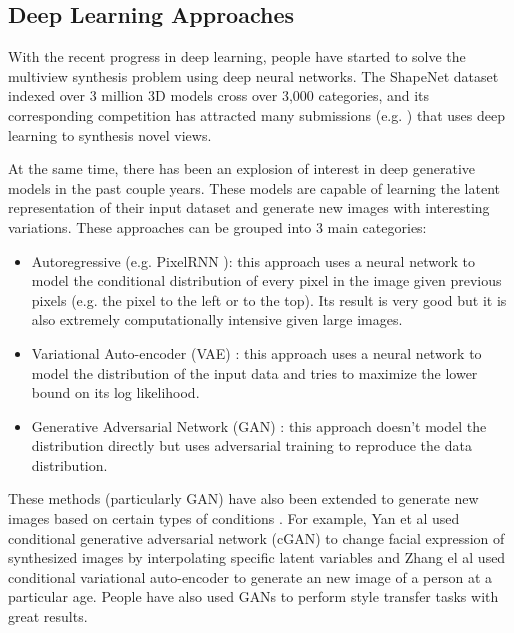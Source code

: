 \documentclass[10pt,conference]{IEEEtran}
\begin{document}
\subsection{Deep Learning Approaches}

With the recent progress in deep learning, people have started to solve the multiview synthesis problem using deep neural networks. The ShapeNet dataset \autocite{chang2015shapenet} indexed over 3 million 3D models cross over 3,000 categories, and its corresponding competition has attracted many submissions (e.g. \autocite{zhou2016view, tatarchenko2016multi, park2017transformation}) that uses deep learning to synthesis novel views.

At the same time, there has been an explosion of interest in deep generative models in the past couple years. These models are capable of learning the latent representation of their input dataset and generate new images with interesting variations. These approaches can be grouped into 3 main categories:

\begin{itemize}
\item Autoregressive (e.g. PixelRNN \autocite{oord2016pixel}): this approach uses a neural network to model the conditional distribution of every pixel in the image given previous pixels (e.g. the pixel to the left or to the top). Its result is very good but it is also extremely computationally intensive given large images.

\item Variational Auto-encoder (VAE) \autocite{kingma2013auto}: this approach uses a neural network to model the distribution of the input data and tries to maximize the lower bound on its log likelihood.

\item Generative Adversarial Network (GAN) \autocite{goodfellow2014generative, radford2015unsupervised}: this approach doesn't model the distribution directly but uses adversarial training to reproduce the data distribution.

\end{itemize}

These methods (particularly GAN) have also been extended to generate new images based on certain types of conditions \autocite{mirza2014conditional}. For example, Yan et al \autocite{yan2016attribute2image} used conditional generative adversarial network (cGAN) to change facial expression of synthesized images by interpolating specific latent variables and Zhang el al \autocite{zhang2017age} used conditional variational auto-encoder to generate an new image of a person at a particular age. People have also used GANs \autocite{isola2016image, zhu2017unpaired} to perform style transfer tasks with great results.
\end{document}
